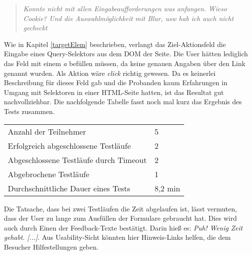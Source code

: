 \vspace{0.3cm}
\begin{quote}
     \glqq \textit{Konnte nicht mit allen Eingabeaufforderungen was anfangen.
    Wieso Cookie? Und die Auswahlmöglichkeit mit Blur, usw hab ich auch nicht gecheckt}\grqq{}
\end{quote}
\vspace{0.3cm}

Wie in Kapitel \ref{targetElem} beschrieben, verlangt das Ziel-Aktionsfeld die Eingabe eines Query-Selektors aus dem \Gls{DOM} der Seite. Die User hätten lediglich das Feld mit einem \glqq \textit{a}\grqq{} befüllen müssen, da keine genauen Angaben über den Link genannt wurden. Als Aktion wäre \glqq \textit{click}\grqq{} richtig gewesen. Da es keinerlei Beschreibung für dieses Feld gab und die Probanden kaum Erfahrungen in Umgang mit Selektoren in einer HTML-Seite hatten, ist das Resultat gut nachvollziehbar. Die nachfolgende Tabelle fasst noch mal kurz das Ergebnis des Tests zusammen.
\\
\begin{center}
{\footnotesize
\begin{tabular}{ p{6.5cm} p{1.1cm} }
  \hline
  Anzahl der Teilnehmer & 5\vspace{0.2cm}\\
  Erfolgreich abgeschlossene Testläufe & 2\vspace{0.2cm}\\
  Abgeschlossene Testläufe durch Timeout & 2\vspace{0.2cm}\\
  Abgebrochene Testläufe & 1\vspace{0.2cm}\\
  Durchschnittliche Dauer eines Tests & 8,2 min\\
  \hline
\end{tabular}
}
\vspace{0.3cm}
 \label{tab:title}
\vspace{0.3cm}
\end{center}

Die Tatsache, dass bei zwei Testläufen die Zeit abgelaufen ist, lässt vermuten, dass der User zu lange zum Ausfüllen der Formulare gebraucht hat. Dies wird auch durch Einen der Feedback-Texte bestätigt. Darin hieß es: \glqq \textit{Puh! Wenig Zeit gehabt. [...]}\grqq{}. Aus Usability-Sicht könnten hier Hinweis-Links helfen, die dem Besucher Hilfestellungen geben.